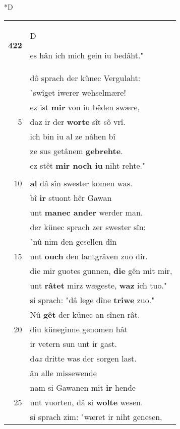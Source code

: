 \documentclass[8pt,a4paper,notitlepage]{article}
\begin{document}
\begin{table}[ht]
\begin{minipage}[t]{0.5\linewidth}
\small
\begin{center}*D
\end{center}
\begin{tabular}{rl}
\textbf{422} & \begin{large}D\end{large}es hân ich mich gein iu bedâht."\\ 
 & dô sprach der künec Vergulaht:\\ 
 & "swîget iwerer wehselmære!\\ 
 & ez ist \textbf{mir} von iu bêden swære,\\ 
5 & daz ir der \textbf{worte} sît sô vrî.\\ 
 & ich bin iu al ze nâhen bî\\ 
 & ze sus getânem \textbf{gebrehte}.\\ 
 & ez stêt \textbf{mir noch iu} niht rehte."\\ 
 & \textbf{\begin{large}D\end{large}iz} was ûf dem palas,\\ 
10 & \textbf{al} dâ sîn swester komen was.\\ 
 & bî \textbf{ir} stuont hêr Gawan\\ 
 & unt \textbf{manec ander} werder man.\\ 
 & der künec sprach zer swester sîn:\\ 
 & "nû nim den gesellen dîn\\ 
15 & unt \textbf{ouch} den lantgrâven zuo dir.\\ 
 & die mir guotes gunnen, \textbf{die} gên mit mir,\\ 
 & unt \textbf{râtet} mirz wægeste, \textbf{waz} ich tuo."\\ 
 & si sprach: "dâ lege dîne \textbf{triwe} zuo."\\ 
 & Nû \textbf{gêt} der künec an sînen rât.\\ 
20 & diu küneginne genomen hât\\ 
 & ir vetern sun unt ir gast.\\ 
 & d\textit{az} dritte was der sorgen last.\\ 
 & ân alle missewende\\ 
 & nam si Gawanen mit \textbf{ir} hende\\ 
25 & unt vuorten, dâ si \textbf{wolte} wesen.\\ 
 & si sprach zim: "wæret ir niht genesen,\\ 

\end{tabular}
\end{minipage}
\end{table}
\end{document}
